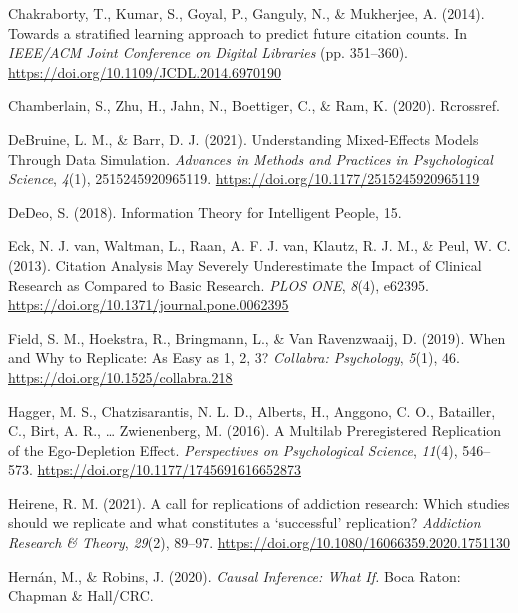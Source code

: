 \documentclass[
  english,
  jou,floatsintext]{apa6}
\newlength{\cslhangindent}
\newlength{\cslentryspacingunit} %
\newenvironment{CSLReferences}[2] %
 {%
  \setlength{\parindent}{0pt}
  \ifodd #1
  \let\oldpar\par
  \def\par{\hangindent=\cslhangindent\oldpar}
  \fi
  \setlength{\parskip}{#2\cslentryspacingunit}
 }%
 {}
\begin{document}
\begin{CSLReferences}{1}{0}
\leavevmode{}%
Chakraborty, T., Kumar, S., Goyal, P., Ganguly, N., \& Mukherjee, A. (2014). Towards a stratified learning approach to predict future citation counts. In \emph{{IEEE}/{ACM Joint Conference} on {Digital Libraries}} (pp. 351--360). \url{https://doi.org/10.1109/JCDL.2014.6970190}

\leavevmode{}%
Chamberlain, S., Zhu, H., Jahn, N., Boettiger, C., \& Ram, K. (2020). Rcrossref.

\leavevmode{}%
DeBruine, L. M., \& Barr, D. J. (2021). Understanding {Mixed}-{Effects Models Through Data Simulation}. \emph{Advances in Methods and Practices in Psychological Science}, \emph{4}(1), 2515245920965119. \url{https://doi.org/10.1177/2515245920965119}

\leavevmode{}%
DeDeo, S. (2018). Information {Theory} for {Intelligent People}, 15.

\leavevmode{}%
Eck, N. J. van, Waltman, L., Raan, A. F. J. van, Klautz, R. J. M., \& Peul, W. C. (2013). Citation {Analysis May Severely Underestimate} the {Impact} of {Clinical Research} as {Compared} to {Basic Research}. \emph{PLOS ONE}, \emph{8}(4), e62395. \url{https://doi.org/10.1371/journal.pone.0062395}

\leavevmode{}%
Field, S. M., Hoekstra, R., Bringmann, L., \& Van Ravenzwaaij, D. (2019). When and {Why} to {Replicate}: {As Easy} as 1, 2, 3? \emph{Collabra: Psychology}, \emph{5}(1), 46. \url{https://doi.org/10.1525/collabra.218}

\leavevmode{}%
Hagger, M. S., Chatzisarantis, N. L. D., Alberts, H., Anggono, C. O., Batailler, C., Birt, A. R., \ldots{} Zwienenberg, M. (2016). A {Multilab Preregistered Replication} of the {Ego}-{Depletion Effect}. \emph{Perspectives on Psychological Science}, \emph{11}(4), 546--573. \url{https://doi.org/10.1177/1745691616652873}

\leavevmode{}%
Heirene, R. M. (2021). A call for replications of addiction research: Which studies should we replicate and what constitutes a {`successful'} replication? \emph{Addiction Research \& Theory}, \emph{29}(2), 89--97. \url{https://doi.org/10.1080/16066359.2020.1751130}

\leavevmode{}%
Hernán, M., \& Robins, J. (2020). \emph{Causal {Inference}: {What If}.} {Boca Raton}: {Chapman \& Hall/CRC}.


\end{CSLReferences}
\end{document}
